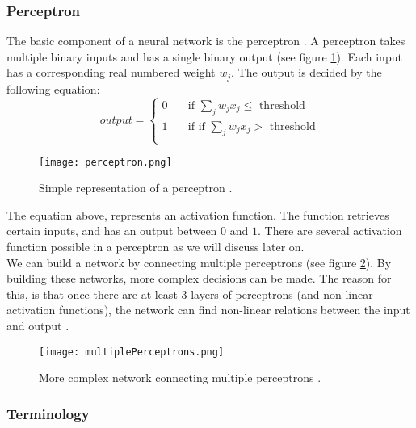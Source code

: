 		\subsubsection{Perceptron}

The basic component of a neural network is the perceptron \cite{perceptron:article}. A perceptron takes multiple binary inputs and has a single binary output (see figure \ref{fig:perceptron}). Each input has a corresponding real numbered weight $w_j$. The output is decided by the following equation: \\

\begin{equation} 
output =
  \begin{cases}
    0       	& \quad \text{if } \sum_j w_jx_j \leq \text{ threshold}\\
    1  		& \quad \text{if } \text{if } \sum_j w_jx_j > \text{ threshold}\\
  \end{cases}
\end{equation}
	
\begin{figure}[!htb]
	\centering
	\texttt{[image: perceptron.png]}
	\caption{Simple representation of a perceptron \cite{NNintro:online}.}
	\label{fig:perceptron}
\end{figure}

The equation above, represents an activation function. The function retrieves certain inputs, and has an output between $0$ and $1$. There are several activation function possible in a perceptron as we will discuss later on. \\
We can build a network by connecting multiple perceptrons (see figure \ref{fig:multiplePerceptrons}). By building these networks, more complex decisions can be made. The reason for this, is that once there are at least $3$ layers of perceptrons (and non-linear activation functions), the network can find non-linear relations between the input and output \cite{nnNL:article}. \\

\begin{figure}[!htb]
	\centering
	\texttt{[image: multiplePerceptrons.png]}
	\caption{More complex network connecting multiple perceptrons \cite{NNintro:online}.}
	\label{fig:multiplePerceptrons}
\end{figure}


		\subsubsection{Terminology}

